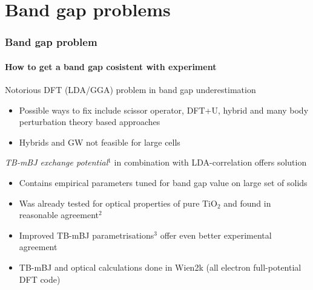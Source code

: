 \documentclass[noamsthm,8pt,t]{beamer}
\begin{document}
\section{Band gap problems}
\begin{frame}
   \frametitle{Band gap problem}
   \framesubtitle{How to get a band gap cosistent with experiment}

   \vspace{-0.2cm}
   Notorious DFT (LDA/GGA) problem in band gap underestimation
   \begin{itemize}
      \item Possible ways to fix include scissor operator, DFT+U, hybrid and many body perturbation theory based approaches
      \item Hybrids and GW not feasible for large cells
   \end{itemize}

   \pause

   \emph{TB-mBJ exchange potential}$^1$ in combination with LDA-correlation offers solution
   \begin{itemize}
      \item<2-> Contains empirical parameters tuned for band gap value on large set of solids 
      \item<3-> Was already tested for optical properties of pure TiO$_2$ and found in reasonable agreement$^2$
      \item<3-> Improved TB-mBJ parametrisations$^3$ offer even better experimental agreement
      \item<3-> TB-mBJ and optical calculations done in Wien2k (all electron full-potential DFT code)
   \end{itemize}

   
\end{frame}
\end{document}
